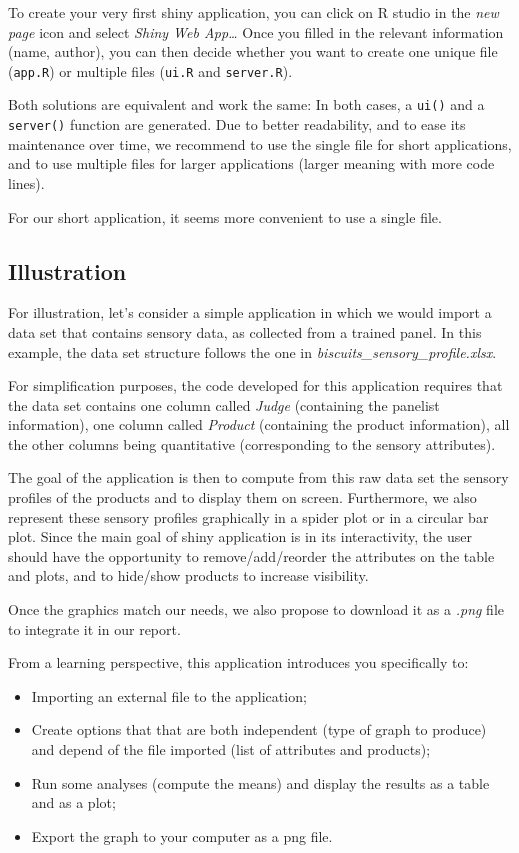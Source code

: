 \documentclass[
]{krantz}
\providecommand{\tightlist}{%
  \setlength{\itemsep}{0pt}\setlength{\parskip}{0pt}}
\begin{document}
To create your very first shiny application, you can click on R studio in the \emph{new page} icon and select \emph{Shiny Web App\ldots{}}
Once you filled in the relevant information (name, author), you can then decide whether you want to create one unique file (\texttt{app.R}) or multiple files (\texttt{ui.R} and \texttt{server.R}).

Both solutions are equivalent and work the same: In both cases, a \texttt{ui()} and a \texttt{server()} function are generated. Due to better readability, and to ease its maintenance over time, we recommend to use the single file for short applications, and to use multiple files for larger applications (larger meaning with more code lines).

For our short application, it seems more convenient to use a single file.

\hypertarget{illustration}{%
\subsection{Illustration}\label{illustration}}

For illustration, let's consider a simple application in which we would import a data set that contains sensory data, as collected from a trained panel. In this example, the data set structure follows the one in \emph{biscuits\_sensory\_profile.xlsx}.

For simplification purposes, the code developed for this application requires that the data set contains one column called \emph{Judge} (containing the panelist information), one column called \emph{Product} (containing the product information), all the other columns being quantitative (corresponding to the sensory attributes).

The goal of the application is then to compute from this raw data set the sensory profiles of the products and to display them on screen. Furthermore, we also represent these sensory profiles graphically in a spider plot or in a circular bar plot.
Since the main goal of shiny application is in its interactivity, the user should have the opportunity to remove/add/reorder the attributes on the table and plots, and to hide/show products to increase visibility.

Once the graphics match our needs, we also propose to download it as a \emph{.png} file to integrate it in our report.

From a learning perspective, this application introduces you specifically to:

\begin{itemize}
\tightlist
\item
  Importing an external file to the application;
\item
  Create options that that are both independent (type of graph to produce) and depend of the file imported (list of attributes and products);
\item
  Run some analyses (compute the means) and display the results as a table and as a plot;
\item
  Export the graph to your computer as a png file.
\end{itemize}
\end{document}
